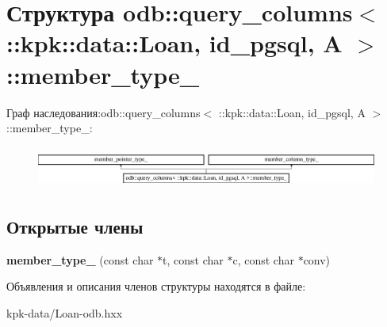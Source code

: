 \hypertarget{structodb_1_1query__columns_3_01_1_1kpk_1_1data_1_1_loan_00_01id__pgsql_00_01_a_01_4_1_1member__type__}{}\section{Структура odb\+:\+:query\+\_\+columns$<$ \+:\+:kpk\+:\+:data\+:\+:Loan, id\+\_\+pgsql, A $>$\+:\+:member\+\_\+type\+\_\+}
\label{structodb_1_1query__columns_3_01_1_1kpk_1_1data_1_1_loan_00_01id__pgsql_00_01_a_01_4_1_1member__type__}
Граф наследования\+:odb\+:\+:query\+\_\+columns$<$ \+:\+:kpk\+:\+:data\+:\+:Loan, id\+\_\+pgsql, A $>$\+:\+:member\+\_\+type\+\_\+\+:\begin{figure}[H]
\begin{center}
\leavevmode
\includegraphics[height=1.379310cm]{structodb_1_1query__columns_3_01_1_1kpk_1_1data_1_1_loan_00_01id__pgsql_00_01_a_01_4_1_1member__type__}
\end{center}
\end{figure}
\subsection*{Открытые члены}
\begin{DoxyCompactItemize}
\item 
{\bfseries member\+\_\+type\+\_\+} (const char $\ast$t, const char $\ast$c, const char $\ast$conv)\hypertarget{structodb_1_1query__columns_3_01_1_1kpk_1_1data_1_1_loan_00_01id__pgsql_00_01_a_01_4_1_1member__type___ab1b5a4fa670fa475d392d8c137dc73ae}{}\label{structodb_1_1query__columns_3_01_1_1kpk_1_1data_1_1_loan_00_01id__pgsql_00_01_a_01_4_1_1member__type___ab1b5a4fa670fa475d392d8c137dc73ae}

\end{DoxyCompactItemize}


Объявления и описания членов структуры находятся в файле\+:\begin{DoxyCompactItemize}
\item 
kpk-\/data/Loan-\/odb.\+hxx\end{DoxyCompactItemize}
